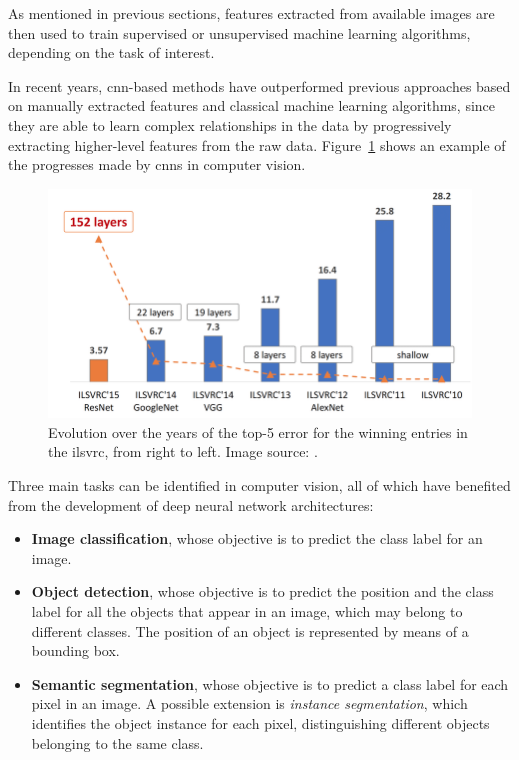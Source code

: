 \documentclass[%
    corpo=12pt,
    twoside,
    stile=classica,   
    tipotesi=magistrale,
    evenboxes,
    english,
	numerazioneromana,
]{toptesi}
\begin{document}
As mentioned in previous sections, features extracted from available images are then used to train supervised or unsupervised machine learning algorithms, depending on the task of interest.

\medskip
In recent years, \gls{cnn}-based methods have outperformed previous approaches based on manually extracted features and classical machine learning algorithms, since they are able to learn complex relationships in the data by progressively extracting higher-level features from the raw data.
Figure~\ref{fig:imagenet} shows an example of the progresses made by \glspl{cnn} in computer vision.

\begin{figure}[ht]
	\centering
	\includegraphics[width=.8\textwidth]{imgs/ILSVRC.png}
	\caption[Evolution of top-5 error for the winning entries in \gls{ilsvrc}]{Evolution over the years of the top-5 error for the winning entries in the \gls{ilsvrc}, from right to left\cite{russakovsky2015imagenet}. Image source: \cite{hanqing2020research}.
	\label{fig:imagenet}}
\end{figure}

\bigskip
Three main tasks can be identified in computer vision, all of which have benefited from the development of deep neural network architectures:

\begin{itemize}
	\item \textbf{Image classification}, whose objective is to predict the class label for an image.
	\item \textbf{Object detection}, whose objective is to predict the position and the class label for all the objects that appear in an image, which may belong to different classes. The position of an object is represented by means of a bounding box.
	\item \textbf{Semantic segmentation}, whose objective is to predict a class label for each pixel in an image. A possible extension is \textit{instance segmentation}, which identifies the object instance for each pixel, distinguishing different objects belonging to the same class.
\end{itemize}
\end{document}
